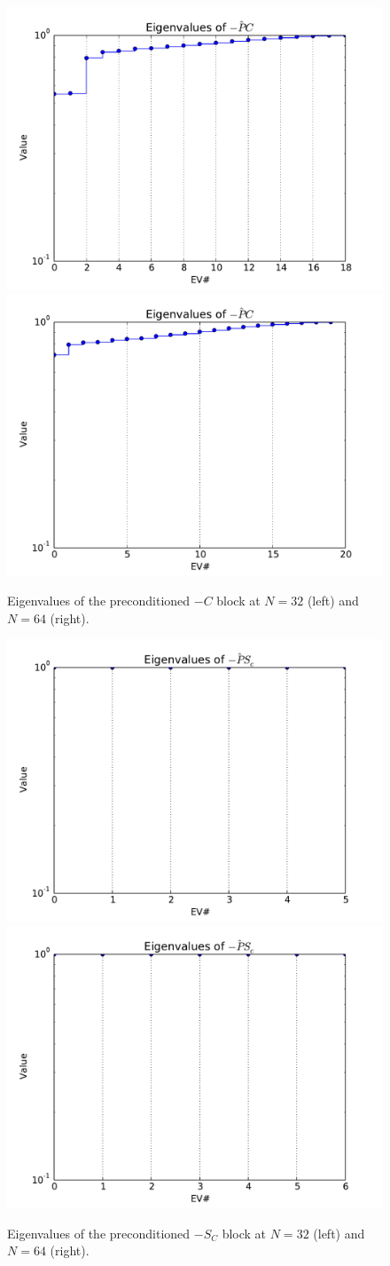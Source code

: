 \documentclass{article}
\begin{document}
\begin{figure}
\begin{center}
\includegraphics[width=.49\linewidth]{../EV[-C],problem=2,exact=0,N=32.pdf}
\includegraphics[width=.49\linewidth]{../EV[-C],problem=2,exact=0,N=64.pdf}
\caption{Eigenvalues of the preconditioned $-C$ block at $N=32$ (left) and $N=64$ (right).}
\label{evC}
\end{center}
\end{figure}


\begin{figure}
\begin{center}
\includegraphics[width=.49\linewidth]{../EV[-S_c],problem=2,exact=0,N=32.pdf}
\includegraphics[width=.49\linewidth]{../EV[-S_c],problem=2,exact=0,N=64.pdf}
\caption{Eigenvalues of the preconditioned $-S_C$ block at $N=32$ (left) and $N=64$ (right).}
\label{evS}
\end{center}
\end{figure}
\end{document}
